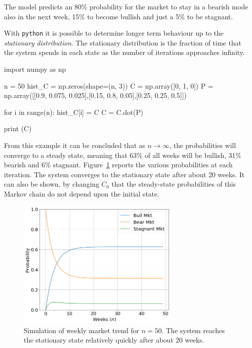 The model predicts an 80\% probability for the market to stay in a bearish mode also in the next week, 15\% to become bullish and just a 5\% to be stagnant.

With \texttt{python} it is possible to determine longer term behaviour up to the \emph{stationary distribution}. The stationary distribution is the fraction of time that the system spends in each state as the number of iterations approaches infinity.

\begin{ipython}
import numpy as np

n = 50
hist_C = np.zeros(shape=(n, 3))
C = np.array([0, 1, 0])
P = np.array([[0.9, 0.075, 0.025],[0.15, 0.8, 0.05],[0.25, 0.25, 0.5]])

for i in range(n):
    hist_C[i] = C
    C = C.dot(P)

print (C)
\end{ipython}
\begin{ioutput}
[0.62499979 0.31250019 0.06250002]
\end{ioutput}

From this example it can be concluded that as $n \rightarrow \infty$, the probabilities will converge to a steady state, meaning that 63\% of all weeks will be bullish, 31\% bearish and 6\% stagnant. Figure~\ref{fig:markov_chain_sim} reports the various probabilities at each iteration. The system converges to the stationary state after about 20 weeks.
It can also be shown, by changing $C_0$ that the steady-state probabilities of this Markov chain do not depend upon the initial state. 

\begin{figure}[!t]
	\centering
	\includegraphics[width=0.7\textwidth]{figures/markov_chain_sim}
	\caption{Simulation of weekly market trend for $n=50$. The system reaches the stationary state relatively quickly after about 20 weeks.}
	\label{fig:markov_chain_sim}
\end{figure}

